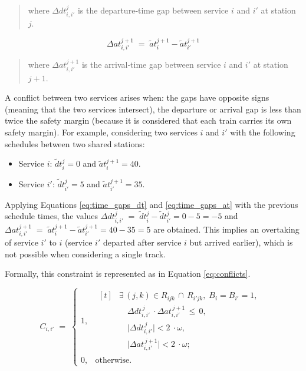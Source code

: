 \documentclass[Afour,sagev,times]{sagej}
\begin{document}
\begin{quote}
where $\Delta dt_{i,i'}^{j}$ is the departure‐time gap between service $i$ and $i'$ at station $j$.
\end{quote}


\begin{equation}
\Delta at_{i,i'}^{j+1} \;=\; \tilde at_{i}^{j+1} - \tilde at_{i'}^{j+1}
\label{eq:time_gaps_at}
\end{equation}

\begin{quote}
where $\Delta at_{i,i'}^{j+1}$ is the arrival‐time gap between service $i$ and $i'$ at station $j+1$.
\end{quote}

A conflict between two services arises when: the gaps have opposite signs (meaning that the two services intersect), the departure or arrival gap is less than twice the safety margin (because it is considered that each train carries its own safety margin). For example, considering two services $ i $ and $ i' $ with the following schedules between two shared stations:

\begin{itemize}
    \item Service $ i $: $ \tilde dt_{i}^{j} = 0 $ and $ \tilde at_{i}^{j+1} = 40 $.
    \item Service $ i' $: $ \tilde dt_{i'}^{j} = 5 $ and $ \tilde at_{i'}^{j+1} = 35 $.
\end{itemize}

Applying Equations  \ref{eq:time_gaps_dt} and \ref{eq:time_gaps_at} with the previous schedule times, the values $ \Delta dt_{i,i'}^{j} \;=\; \tilde dt_{i}^{j} - \tilde dt_{i'}^{j} = 0 - 5 = - 5 $ and $ \Delta at_{i,i'}^{j+1} \;=\; \tilde at_{i}^{j+1} - \tilde at_{i'}^{j+1} = 40 - 35 = 5 $ are obtained. This implies an overtaking of service  $ i' $ to $ i $ (service $ i' $ departed after service $ i $ but arrived earlier), which is not possible when considering a single track.

Formally, this constraint is represented as in Equation \ref{eq:conflicts}.

\begin{equation}
C_{i,i'} \;=\;
\begin{cases}
1, & 
\begin{aligned}[t]
&\exists\,(j,k)\in R_{ijk}\,\cap\,R_{i'jk},\;B_{i}=B_{i'}=1,\; \\
&\quad \Delta dt_{i,i'}^{\,j}\ \cdot \Delta at_{i,i'}^{\,j+1} \,\le\,0,\\
&\quad \bigl|\Delta dt_{i,i'}^{\,j}\bigr| < 2\ \cdot \omega,\\
&\quad \bigl|\Delta at_{i,i'}^{\,j+1}\bigr| < 2\ \cdot \omega;
\end{aligned}
\\[2ex]
0, & \text{otherwise.}
\end{cases}
\label{eq:conflicts}
\end{equation}
\end{document}
